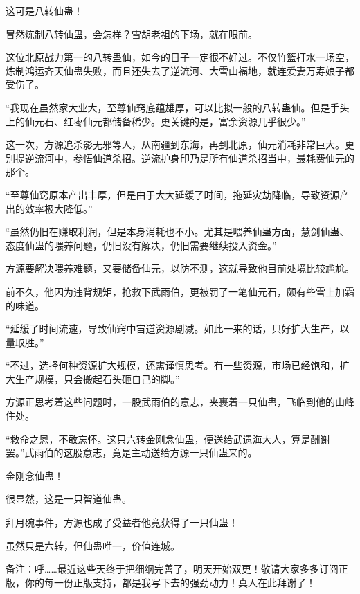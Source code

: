 \begin{this_body}
这可是八转仙蛊！

冒然炼制八转仙蛊，会怎样？雪胡老祖的下场，就在眼前。

这位北原战力第一的八转蛊仙，如今的日子一定很不好过。不仅竹篮打水一场空，炼制鸿运齐天仙蛊失败，而且还失去了逆流河、大雪山福地，就连爱妻万寿娘子都受伤了。

“我现在虽然家大业大，至尊仙窍底蕴雄厚，可以比拟一般的八转蛊仙。但是手头上的仙元石、红枣仙元都储备稀少。更关键的是，富余资源几乎很少。”

这一次，方源追杀影无邪等人，从南疆到东海，再到北原，仙元消耗非常巨大。更别提逆流河中，参悟仙道杀招。逆流护身印乃是所有仙道杀招当中，最耗费仙元的那个。

“至尊仙窍原本产出丰厚，但是由于大大延缓了时间，拖延灾劫降临，导致资源产出的效率极大降低。”

“虽然仍旧在赚取利润，但是本身消耗也不小。尤其是喂养仙蛊方面，慧剑仙蛊、态度仙蛊的喂养问题，仍旧没有解决，仍旧需要继续投入资金。”

方源要解决喂养难题，又要储备仙元，以防不测，这就导致他目前处境比较尴尬。

前不久，他因为违背规矩，抢救下武雨伯，更被罚了一笔仙元石，颇有些雪上加霜的味道。

“延缓了时间流速，导致仙窍中宙道资源剧减。如此一来的话，只好扩大生产，以量取胜。”

“不过，选择何种资源扩大规模，还需谨慎思考。有一些资源，市场已经饱和，扩大生产规模，只会搬起石头砸自己的脚。”

方源正思考着这些问题时，一股武雨伯的意志，夹裹着一只仙蛊，飞临到他的山峰住处。

“救命之恩，不敢忘怀。这只六转金刚念仙蛊，便送给武遗海大人，算是酬谢罢。”武雨伯的这股意志，竟是主动送给方源一只仙蛊来的。

金刚念仙蛊！

很显然，这是一只智道仙蛊。

拜月碗事件，方源也成了受益者他竟获得了一只仙蛊！

虽然只是六转，但仙蛊唯一，价值连城。

备注：呼……最近这些天终于把细纲完善了，明天开始双更！敬请大家多多订阅正版，你的每一份正版支持，都是我写下去的强劲动力！真人在此拜谢了！

\end{this_body}

